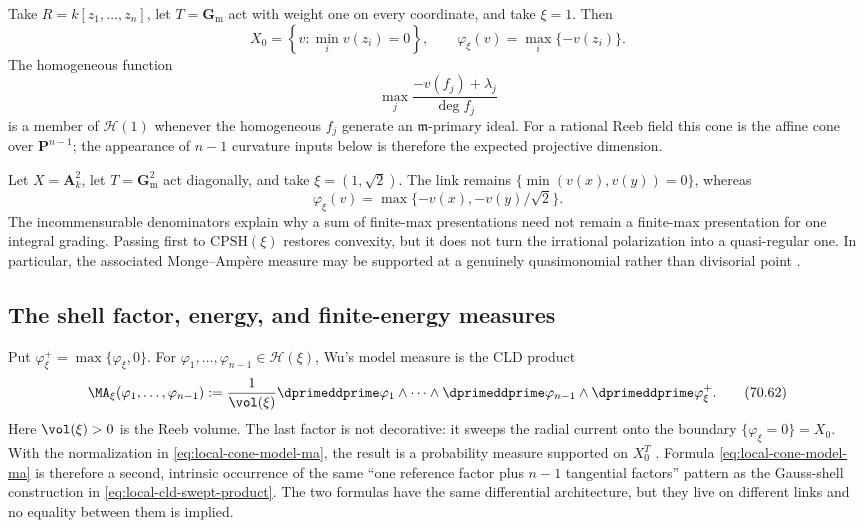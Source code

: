 \begin{example}
\label{ex:local-cone-affine-space}
Take $R=k[z_1,\ldots,z_n]$, let $T=\mathbf G_{\mathrm m}$ act with
weight one on every coordinate, and take $\xi=1$.  Then
\[
 X_0=\left\{v:\min_i v(z_i)=0\right\},
 \qquad
 \varphi_\xi(v)=\max_i\{-v(z_i)\}.
\]
The homogeneous function
\[
 \max_j\frac{-v(f_j)+\lambda_j}{\deg f_j}
\]
is a member of $\mathcal H(1)$ whenever the homogeneous $f_j$ generate
an $\mathfrak m$-primary ideal.  For a rational Reeb field this cone is
the affine cone over $\mathbf P^{n-1}$; the appearance of $n-1$ curvature
inputs below is therefore the expected projective dimension.
\end{example}

\begin{example}
\label{ex:local-cone-irrational-reeb}
Let $X=\mathbf A_k^2$, let $T=\mathbf G_{\mathrm m}^2$ act diagonally,
and take $\xi=(1,\sqrt2)$.  The link remains
$\{\min(v(x),v(y))=0\}$, whereas
\[
 \varphi_\xi(v)=\max\{-v(x),-v(y)/\sqrt2\}.
\]
The incommensurable denominators explain why a sum of finite-max
presentations need not remain a finite-max presentation for one integral
grading.  Passing first to $\mathrm{CPSH}(\xi)$ restores convexity, but it
does not turn the irrational polarization into a quasi-regular one.  In
particular, the associated Monge--Amp\`ere measure may be supported at a
genuinely quasimonomial rather than divisorial point
\cite[Introduction]{Wu24AffineCones}.
\end{example}

\subsection{The shell factor, energy, and finite-energy measures}
\label{subsec:local-cone-shell-energy}

Put $\varphi_\xi^+=\max\{\varphi_\xi,0\}$.  For
$\varphi_1,\ldots,\varphi_{n-1}\in\mathcal H(\xi)$, Wu's model measure is
the CLD product
\[
 \MA_\xi(\varphi_1,\ldots,\varphi_{n-1})
 :=\frac{1}{\vol(\xi)}
   \dprimeddprime\varphi_1\wedge\cdots\wedge
   \dprimeddprime\varphi_{n-1}\wedge
   \dprimeddprime\varphi_\xi^+.
\tag{70.62}\label{eq:local-cone-model-ma}
\]
Here $\vol(\xi)>0$ is the Reeb volume.  The last factor is not decorative:
it sweeps the radial current onto the boundary
$\{\varphi_\xi=0\}=X_0$.  With the normalization in
\eqref{eq:local-cone-model-ma}, the result is a probability measure supported
on $X_0^T$ \cite[Corollary~5.7]{Wu22AffineEnergy}
\cite[Theorem~2.12 and Proposition~4.2(1)]{Wu24AffineCones}.  Formula
\eqref{eq:local-cone-model-ma} is therefore a second, intrinsic occurrence of
the same ``one reference factor plus $n-1$ tangential factors'' pattern as
the Gauss-shell construction in \eqref{eq:local-cld-swept-product}.  The two
formulas have the same differential architecture, but they live on different
links and no equality between them is implied.

